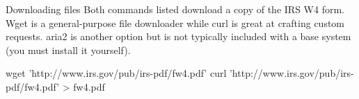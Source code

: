 \begin{block}{Downloading files}
  Both commands listed download a copy of the IRS W4 form. Wget is a general-purpose file downloader while curl is great at crafting custom requests. aria2 is another option but is not typically included with a base system (you must install it yourself).
  \begin{indented}
    \begin{bashcode}
      wget 'http://www.irs.gov/pub/irs-pdf/fw4.pdf'
      curl 'http://www.irs.gov/pub/irs-pdf/fw4.pdf' > fw4.pdf
    \end{bashcode}
  \end{indented}
\end{block}
